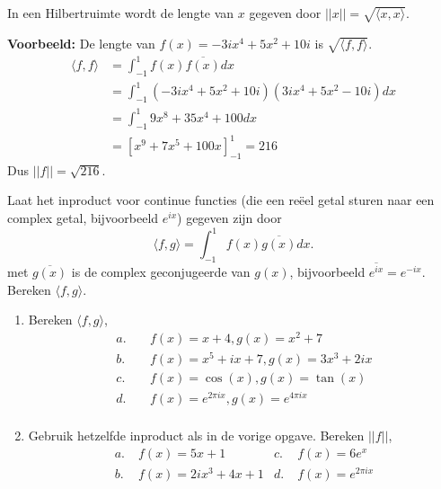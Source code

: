 \documentclass[../main.tex]{subfiles}
\begin{document}
In een Hilbertruimte wordt de lengte van $x$ gegeven door $||x||=\sqrt{\langle x,x\rangle}$.

\textbf{Voorbeeld:} De lengte van $f(x)=-3ix^4+5x^2+10i$ is $\sqrt{\langle f,f\rangle}$.
\begin{align*}
    \langle f,f\rangle
    &= \int_{-1}^1 f(x)\overline{f(x)}  dx\\
    &= \int_{-1}^1 (-3ix^4+5x^2+10i)(3ix^4+5x^2-10i) dx\\
    &= \int_{-1}^1 9x^8+35x^4+100 dx\\
    &= \left[x^9+7x^5+100x\right]_{-1}^1=216
\end{align*}
Dus $||f||=\sqrt{216}$.

\begin{opdracht}
Laat het inproduct voor continue functies (die een reëel getal sturen naar een complex getal, bijvoorbeeld $e^{ix}$) gegeven zijn door $$\langle f,g\rangle=\int_{-1}^1 f(x)\overline{g(x)}dx.$$ met $\overline{g(x)}$ is de complex geconjugeerde van $g(x)$, bijvoorbeeld $\overline{e^{ix}}=e^{-ix}$.\\ Bereken $\langle f,g\rangle$.

\begin{enumerate}
    \item Bereken $\langle f,g\rangle$, \begin{align*}
        a.&\;& f(x)=x+4,g(x)=x^2+7\\
        b.&\;& f(x)=x^5+ix+7,g(x)=3x^3+2ix\\
        c.&\;& f(x)=\cos(x),g(x)=\tan(x)\\
        d.&\;& f(x)=e^{2\pi ix},g(x)=e^{4\pi ix}\\
    \end{align*}
\item Gebruik hetzelfde inproduct als in de vorige opgave. Bereken $||f||$, \begin{align*}
        a.\;& f(x)=5x+1
        & c.\;& f(x)=6e^x\\
        b.\;& f(x)=2ix^3+4x+1
        & d.\;& f(x)=e^{2\pi ix}
    \end{align*}
\end{enumerate}
\end{opdracht}
\end{document}
